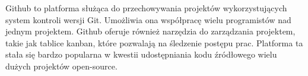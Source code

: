 Github to platforma służąca do przechowywania projektów wykorzystujących system kontroli wersji Git. Umożliwia ona współpracę wielu programistów nad jednym projektem. Github oferuje również narzędzia do zarządzania projektem, takie jak tablice kanban, które pozwalają na śledzenie postępu prac. Platforma ta stała się bardzo popularna w kwestii udostępniania kodu źródłowego wielu dużych projektów open-source. \autocite{github}